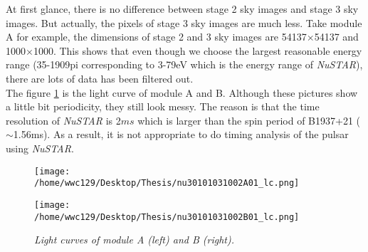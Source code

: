 \documentclass[12pt]{report}
\newcommand{\mycaption}[1]{\caption{\textit{\footnotesize #1}}}
\begin{document}
        At first glance, there is no difference between stage 2 sky images and stage 3 sky images. But actually, 
        the pixels of stage 3 sky images are much less. Take module A for example, the dimensions of stage 2 and 3
        sky images are 54137$\times$54137 and 1000$\times$1000. This shows that even though we choose the largest
        reasonable energy range (35-1909pi corresponding to 3-79eV which is the energy range of \textit{NuSTAR}), 
        there are lots of data has been filtered out.\\
        \indent
        The figure \ref{fig:lightcurves} is the light curve of module A and B. Although these pictures show a little 
        bit periodicity, they still look messy. The reason is that the time resolution of \textit{NuSTAR} is 2$ms$
        which is larger than the spin period of B1937+21 ($\sim$1.56ms). As a result, it is not appropriate to do 
        timing analysis of the pulsar using \textit{NuSTAR}. \\
        \begin{figure}[h]
          \begin{minipage}{0.45\textwidth}
            \begin{flushleft}
                \texttt{[image: /home/wwc129/Desktop/Thesis/nu30101031002A01\_lc.png]}
              \end{flushleft}
            \end{minipage}
          \hspace{0.1cm} 
          \begin{minipage}{0.45\textwidth}
            \texttt{[image: /home/wwc129/Desktop/Thesis/nu30101031002B01\_lc.png]}
          \end{minipage}
          \mycaption{Light curves of module A (left) and B (right).}
          \label{fig:lightcurves}
        \end{figure}
\end{document}
